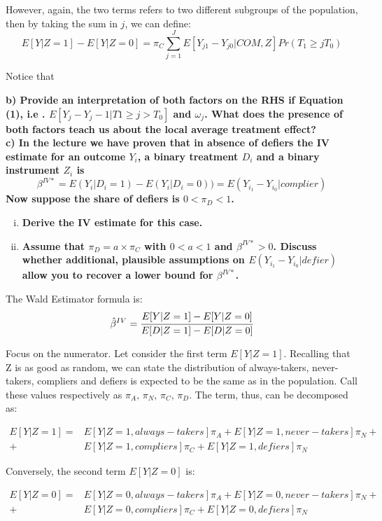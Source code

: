 \documentclass[a4paper,12pt,oneside,English]{article}
\begin{document}
However, again, the two terms refers to two different subgroups of the population, then by taking the sum in $j$, we can define:
\[
E[Y|Z=1]-E[Y|Z=0]=\pi_C\sum_{j=1}^J E[Y_{j1}-Y_{j0}|COM, Z] Pr(T_1\geq j T_0)
\]

Notice that 

\textbf{b) Provide an interpretation of both factors on the RHS if Equation (1), i.e . $E [Y_j − Y_j−1 | T1 \geq j > T_0]$
and $\omega_j$. What does the presence of both factors teach us about the local average treatment effect?\\
c) In the lecture we have proven that in absence of defiers the IV estimate for an outcome $Y_i$, a binary treatment $D_i$ and a binary instrument $Z_i$ is
\begin{equation}
    \beta^{IV*} = E(Y_i|D_i = 1) - E(Y_i|D_i = 0)) = E(Y_i_1 - Y_i_0|complier)
\end{equation}
Now suppose the share of defiers is $0 < \pi_D < 1$.}
\begin{enumerate}[i)]
    \item \textbf{Derive the IV estimate for this case.}
    \item \textbf{Assume that $\pi_D = a × \pi_C$ with $0 < a < 1$ and $\beta^{IV*}> 0$. Discuss whether additional, plausible assumptions on $E(Y_i_1 - Y_i_0|defier)$ allow you to recover a lower bound for $\beta^{IV*}$.}
\end{enumerate}

The Wald Estimator formula is:
\[
\hat\beta^{IV}=\cfrac{E[Y|Z=1]-E[Y|Z=0]}{E[D|Z=1]-E[D|Z=0]}
\]

Focus on the numerator. Let consider the first term $E[Y|Z=1]$. Recalling that Z is as good as random, we can state the distribution of always-takers, never-takers, compliers and defiers is expected to be the same as in the population. Call these values respectively as $\pi_A,\,\pi_N,\,\pi_C,\,\pi_D$. The term, thus, can be decomposed as:

\[
\begin{split}
    E[Y|Z=1]=&E[Y|Z=1, always-takers]\pi_A+E[Y|Z=1, never-takers]\pi_N+\\
    +&E[Y|Z=1, compliers]\pi_C+E[Y|Z=1, defiers]\pi_N
\end{split}
\]

Conversely, the second term $E[Y|Z=0]$ is:

\[
\begin{split}
    E[Y|Z=0]=&E[Y|Z=0, always-takers]\pi_A+E[Y|Z=0, never-takers]\pi_N+\\
    +&E[Y|Z=0, compliers]\pi_C+E[Y|Z=0, defiers]\pi_N
\end{split}
\]
\end{document}
